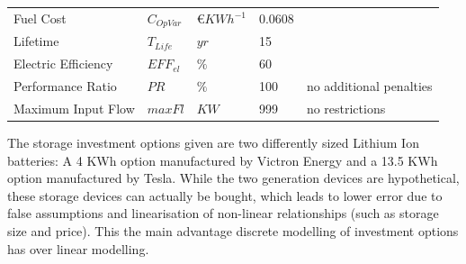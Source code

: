 \documentclass[
	11pt,								%
	DIV10,								%
	a4paper,         					%
	oneside,							%
	headheight=20pt,					%
	footheight=20pt,					%
    parskip=full,						%
    listof=totoc,						%
	bibliography=totoc,					%
	index=totoc,						%
]{scrartcl}
\begin{document}
\begin{table}[H]
\begin{tabular}{lllll}
		Fuel	 Cost           			& $C_{OpVar}$     		& \euro $KWh^{-1}$   	& 0.0608			& \cite{NaturalGasPrices2018}   \\
		Lifetime                    & $T_{Life}$     		& $yr$  				& 15 				& \cite{LAUINGER201624}    \\
		Electric Efficiency         & $EFF_{el}$       		& $\%$  				& 60				& \cite{BlueGENWorldsMost2018}   \\
		Performance Ratio           & $PR$     		& $\%$  				& 100				& no additional penalties  \\
		Maximum Input Flow  			& $maxFl$     		& $KW$ 		 			& 999				& no restrictions  \\
		\hline
	\end{tabular}
\end{table}

The storage investment options given are two differently sized Lithium Ion batteries: A 4 KWh option manufactured by Victron Energy and a 13.5 KWh option manufactured by Tesla. While the two generation devices are hypothetical, these storage devices can actually be bought, which leads to lower error due to false assumptions and linearisation of non-linear relationships (such as storage size and price). This the main advantage discrete modelling of investment options has over linear modelling.
\end{document}
